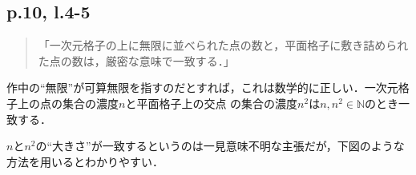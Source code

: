 \documentclass[10pt, a5paper, twoside]{jsarticle}
\theoremstyle{definition}
\begin{document}
		\subsection{p.10, l.4-5}

			\begin{quote}

				「一次元格子の上に無限に並べられた点の数と，平面格子に敷き詰められた点の数は，厳密な意味で一致する．」
				
			\end{quote}

			作中の“無限”が可算無限を指すのだとすれば，これは数学的に正しい．一次元格子上の点の集合の濃度$n$と平面格子上の交点
			の集合の濃度$n^2$は$n, n^2 \in \mathbb{N}$のとき一致する．

			$n$と$n^2$の“大きさ”が一致するというのは一見意味不明な主張だが，下図のような方法を用いるとわかりやすい．

			\vspace{2mm}
\end{document}
